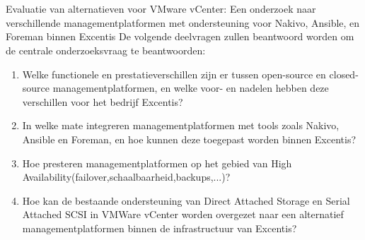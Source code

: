 \section{}%
\label{sec:onderzoeksvraag}

Evaluatie van alternatieven voor VMware vCenter: Een onderzoek naar verschillende managementplatformen met ondersteuning voor Nakivo, Ansible, en Foreman binnen Excentis
\newline De volgende deelvragen zullen beantwoord worden om de centrale onderzoeksvraag te beantwoorden:
\begin{enumerate}
  \item Welke functionele en prestatieverschillen zijn er tussen open-source en closed-source managementplatformen, en welke voor- en nadelen hebben deze verschillen voor het bedrijf Excentis?
  \item In welke mate integreren managementplatformen met tools zoals Nakivo, Ansible en Foreman, en hoe kunnen deze toegepast worden binnen Excentis?
  \item Hoe presteren managementplatformen op het gebied van High Availability(failover,\newline schaalbaarheid,backups,...)?
  \item Hoe kan de bestaande ondersteuning van Direct Attached Storage en Serial Attached SCSI in VMWare vCenter worden overgezet naar een alternatief managementplatformen binnen de infrastructuur van Excentis?
  \end{enumerate}
  
